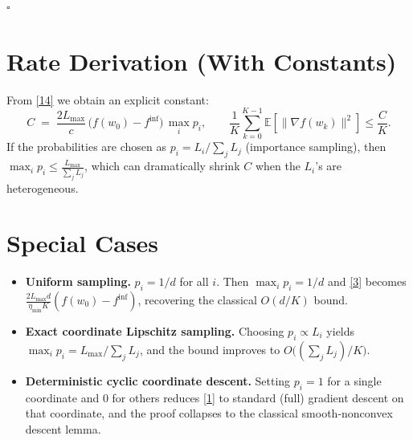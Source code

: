 \documentclass{article}
\newcommand{\E}{\mathbb{E}}
\begin{document}
\hfill $\square$

\section*{Rate Derivation (With Constants)}
From \eqref{14} we obtain an explicit constant:
\[
C\;=\;\frac{2L_{\max}}{c}\,\bigl(f(w_{0})-f^{\inf}\bigr)\,\max_{i}p_{i},
\qquad
\frac{1}{K}\sum_{k=0}^{K-1}\E\!\left[\|\nabla f(w_{k})\|^{2}\right]
\le \frac{C}{K}.
\]
If the probabilities are chosen as
$p_{i}=L_{i}/\sum_{j}L_{j}$ (importance sampling), then
$\max_{i}p_{i}\le \frac{L_{\max}}{\sum_{j}L_{j}}$,
which can dramatically shrink $C$ when the $L_{i}$’s are heterogeneous.

\section*{Special Cases}
\begin{itemize}
\item \textbf{Uniform sampling.} $p_{i}=1/d$ for all $i$.
    Then $\max_{i}p_{i}=1/d$ and \eqref{3} becomes
    $\displaystyle\frac{2L_{\max}d}{\eta_{\min}K}(f(w_{0})-f^{\inf})$,
    recovering the classical $O(d/K)$ bound.
\item \textbf{Exact coordinate Lipschitz sampling.}
    Choosing $p_{i}\propto L_{i}$ yields $\max_{i}p_{i}=L_{\max}/\sum_{j}L_{j}$,
    and the bound improves to $O\!\bigl((\sum_{j}L_{j})/K\bigr)$.
\item \textbf{Deterministic cyclic coordinate descent.}
    Setting $p_{i}=1$ for a single coordinate and $0$ for others reduces \eqref{1}
    to standard (full) gradient descent on that coordinate, and the proof
    collapses to the classical smooth‑nonconvex descent lemma.
\end{itemize}
\end{document}
